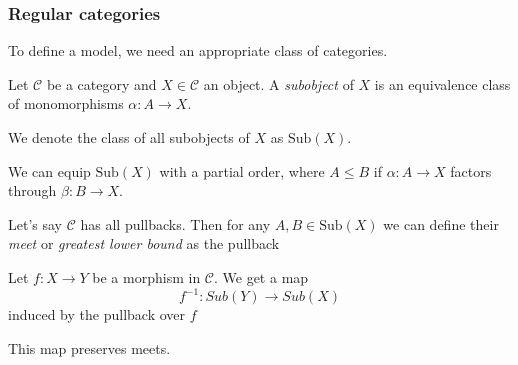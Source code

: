 \documentclass[14pt]{beamer}
\theoremstyle{plain}
\begin{document}
  \begin{frame}[fragile]
    \frametitle{Regular categories}
    To define a model, we need an appropriate class of categories.
    \begin{definition}
      Let $\mathcal{C}$ be a category and $X \in \mathcal{C}$ an object.
      A \emph{subobject} of $X$ is an equivalence class of monomorphisms
      $\alpha : A \to X$. 
      \pause
      
      \begin{center}
      \end{center}
    \end{definition}
  \end{frame}

  \begin{frame}
    \begin{definition}
      We denote the class of all subobjects of $X$ as $\mathrm{Sub}(X)$.
    \end{definition}
    \pause
    We can equip $\mathrm{Sub}(X)$ with a partial order, where $A \leq B$ if
    $\alpha : A \to X$ factors through $\beta : B \to X$.
    \pause
  \end{frame}

  \begin{frame}[fragile]
    Let's say $\mathcal{C}$ has all pullbacks.
    \pause
    Then for any $A, B \in \mathrm{Sub}(X)$ we can define their \emph{meet} or
    \emph{greatest lower bound} as the pullback
    \begin{center}
    \end{center}
  \end{frame}

  \begin{frame}[fragile]
    Let $f : X \to Y$ be a morphism in $\mathcal{C}$. We get a map
    \[ f^{-1} : Sub(Y) \to Sub(X) \]
    \pause
    induced by the pullback over $f$
    \begin{center}
    \end{center}
    \pause
    This map preserves meets.
  \end{frame}
\end{document}
